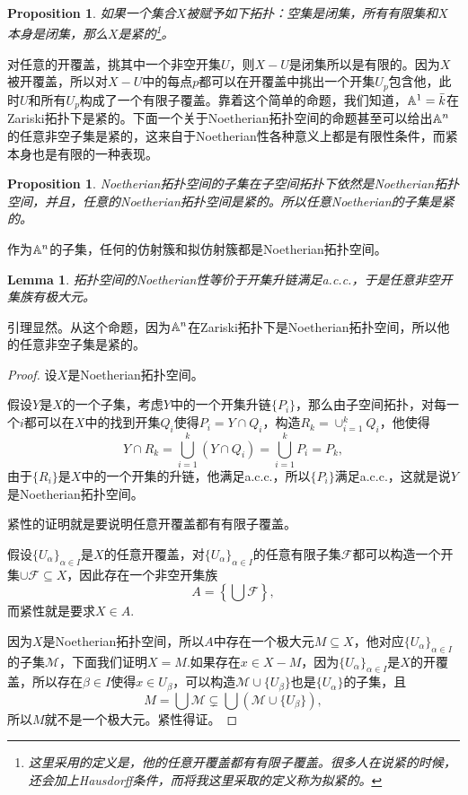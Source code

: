\documentclass[9pt]{extarticle}
\theoremstyle{plain}%
\newtheorem{pro}[defi]{Proposition}%
\newtheorem{lem}[defi]{Lemma}%
\begin{document}
\begin{pro}
如果一个集合$X$被赋予如下拓扑：空集是闭集，所有有限集和$X$本身是闭集，那么$X$是紧的\footnote{这里采用的定义是，他的任意开覆盖都有有限子覆盖。很多人在说紧的时候，还会加上Hausdorff条件，而将我这里采取的定义称为拟紧的。}。
\end{pro}
对任意的开覆盖，挑其中一个非空开集$U$，则$X-U$是闭集所以是有限的。因为$X$被开覆盖，所以对$X-U$中的每点$p$都可以在开覆盖中挑出一个开集$U_p$包含他，此时$U$和所有$U_p$构成了一个有限子覆盖。靠着这个简单的命题，我们知道，$\mathbb{A}^1=\bar{k}$在Zariski拓扑下是紧的。下面一个关于Noetherian拓扑空间的命题甚至可以给出$\mathbb{A}^n$的任意非空子集是紧的，这来自于Noetherian性各种意义上都是有限性条件，而紧本身也是有限的一种表现。
\begin{pro}
	Noetherian拓扑空间的子集在子空间拓扑下依然是Noetherian拓扑空间，并且，任意的Noetherian拓扑空间是紧的。所以任意Noetherian的子集是紧的。
\end{pro}
作为$\mathbb{A}^n$的子集，任何的仿射簇和拟仿射簇都是Noetherian拓扑空间。
\begin{lem}
	拓扑空间的Noetherian性等价于开集升链满足a.c.c.，于是任意非空开集族有极大元。
\end{lem}
引理显然。从这个命题，因为$\mathbb{A}^n$在Zariski拓扑下是Noetherian拓扑空间，所以他的任意非空子集是紧的。
\begin{proof}
	设$X$是Noetherian拓扑空间。

	假设$Y$是$X$的一个子集，考虑$Y$中的一个开集升链$\{P_i\}$，那么由子空间拓扑，对每一个$i$都可以在$X$中的找到开集$Q_i$使得$P_i=Y\cap Q_i$，构造$R_k=\cup_{i=1}^k Q_i$，他使得
	\[
	Y\cap R_k=\bigcup_{i=1}^k (Y \cap Q_i)=\bigcup_{i=1}^k P_i=P_k,
	\]
	由于$\{R_i\}$是$X$中的一个开集的升链，他满足a.c.c.，所以$\{P_i\}$满足a.c.c.，这就是说$Y$是Noetherian拓扑空间。

	紧性的证明就是要说明任意开覆盖都有有限子覆盖。

	假设$\{U_\alpha\}_{\alpha\in I}$是$X$的任意开覆盖，对$\{U_\alpha\}_{\alpha\in I}$的任意有限子集$\mathscr{F}$都可以构造一个开集$\cup \mathscr{F}\subseteq X$，因此存在一个非空开集族
	\[
		A=\left\{\bigcup \mathscr{F}\right\},
	\]
	而紧性就是要求$X\in A$.

	因为$X$是Noetherian拓扑空间，所以$A$中存在一个极大元$M\subseteq X$，他对应$\{U_\alpha\}_{\alpha\in I}$的子集$\mathscr{M}$，下面我们证明$X=M$.如果存在$x\in X-M$，因为$\{U_\alpha\}_{\alpha\in I}$是$X$的开覆盖，所以存在$\beta \in I$使得$x\in U_\beta$，可以构造$\mathscr{M}\cup\{U_\beta\}$也是$\{U_\alpha\}$的子集，且
	\[
		M=\bigcup \mathscr{M}\subsetneq \bigcup\left(\mathscr{M}\cup\{U_\beta\}\right),
	\]
	所以$M$就不是一个极大元。紧性得证。
\end{proof}
\end{document}
